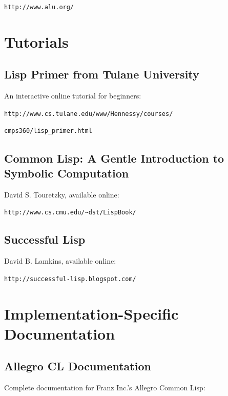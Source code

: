 \begin{center}
\texttt{http://www.alu.org/}
\end{center}

\section{Tutorials}

\subsection{Lisp Primer from Tulane University}

An interactive online tutorial for beginners:

\begin{center}
\texttt{http://www.cs.tulane.edu/www/Hennessy/courses/}

\texttt{cmps360/lisp\_primer.html}
\end{center}

\subsection{Common Lisp: A Gentle Introduction to Symbolic Computation}

David S. Touretzky, available online:

\begin{center}
\texttt{http://www.cs.cmu.edu/\~{}dst/LispBook/}
\end{center}

\subsection{Successful Lisp}

David B. Lamkins, available online:

\begin{center}
\texttt{http://successful-lisp.blogspot.com/}
\end{center}

\section{Implementation-Specific Documentation}

\subsection{Allegro CL Documentation}

Complete documentation for Franz Inc.'s Allegro Common Lisp:

